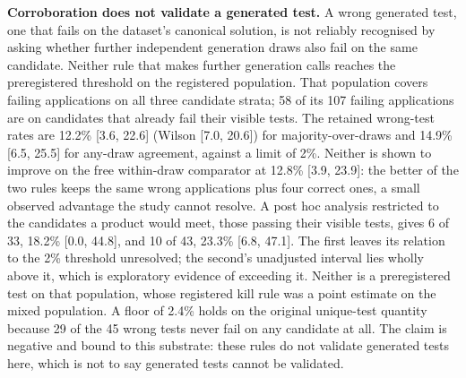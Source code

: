 \textbf{Corroboration does not validate a generated test.} A wrong generated test, one that fails
on the dataset's canonical solution, is not reliably recognised by asking whether further
independent generation draws also fail on the same candidate. Neither rule that makes further generation calls reaches the
preregistered threshold on the registered population. That population covers failing
applications on all three candidate strata; 58 of its 107 failing applications are on candidates
that already fail their visible tests. The retained wrong-test rates are 12.2\% [3.6, 22.6]
(Wilson [7.0, 20.6]) for majority-over-draws and 14.9\% [6.5, 25.5] for any-draw agreement,
against a limit of 2\%. Neither is shown to improve on the free within-draw comparator at 12.8\%
[3.9, 23.9]: the better of the two rules keeps the same wrong applications plus four correct ones,
a small observed advantage the study cannot resolve. A post hoc analysis restricted to the
candidates a product would meet, those passing their visible tests, gives 6 of 33, 18.2\%
[0.0, 44.8], and 10 of 43, 23.3\% [6.8, 47.1]. The first leaves its relation to the 2\%
threshold unresolved; the second's unadjusted interval lies wholly above it, which is exploratory
evidence of exceeding it. Neither is a preregistered test on that population, whose registered
kill rule was a point estimate on the mixed population. A floor of 2.4\% holds on the original
unique-test quantity because 29 of the 45 wrong tests never fail on any candidate at all. The
claim is negative and bound to this substrate: these rules do not validate generated tests here,
which is not to say generated tests cannot be validated.

